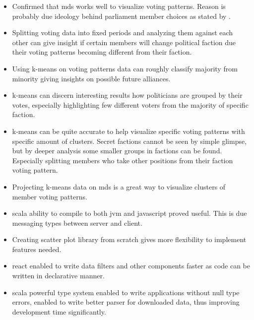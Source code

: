 \documentclass[a4paper,12pt]{article}
\begin{document}
	
	\begin{itemize}
		\item Confirmed that \acrfull{mds} works well to visualize voting patterns. Reason is probably due ideology behind parliament member choices as stated by \cite{poole_2005}.
		\item Splitting voting data into fixed periods and analyzing them against each other can give insight if certain members will change political faction due their voting patterns becoming different from their faction.
		\item Using \gls{k-means} on voting patterns data can roughly classify majority from minority giving insights on possible future alliances.
		\item \gls{k-means} can discern interesting results how politicians are grouped by their votes, especially highlighting few different voters from the majority of specific faction.
		\item \gls{k-means} can be quite accurate to help visualize specific voting patterns with specific amount of clusters. Secret factions cannot be seen by simple glimpse, but by deeper analysis some smaller groups in factions can be found. Especially splitting members who take other positions from their faction voting pattern.
		\item Projecting \acrshort{k-means} data on \acrshort{mds} is a great way to visualize clusters of member voting patterns.
		\item \gls{scala} ability to compile to both \gls{jvm} and \gls{javascript} proved useful. This is due messaging types between server and client.
		\item Creating scatter plot library from scratch gives more flexibility to implement features needed.
		\item \gls{react} enabled to write data filters and other components faster as code can be written in declarative manner.
		\item \gls{scala} powerful type system enabled to write applications without null type errors, enabled to write better parser for downloaded data, thus improving development time significantly. 
		
		
	\end{itemize}
	
	\clearpage
	
	{}
	
	
	\clearpage
	
	
\end{document}
